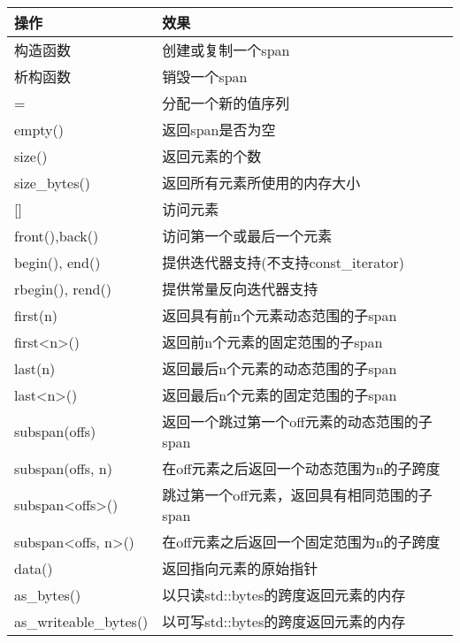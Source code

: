 \begin{longtable}[c]{|l|l|}
\hline
\textbf{操作} & \textbf{效果}                                                      \\ \hline
\endfirsthead
%
\endhead
%
构造函数       & 创建或复制一个span                                             \\ \hline
析构函数         & 销毁一个span                                                      \\ \hline
=                  & 分配一个新的值序列                                    \\ \hline
empty()            & 返回span是否为空                                    \\ \hline
size()             & 返回元素的个数                                       \\ \hline
size\_bytes()      & 返回所有元素所使用的内存大小                     \\ \hline
{[}{]}             & 访问元素                                                  \\ \hline
front(),back()     & 访问第一个或最后一个元素                                   \\ \hline
begin(), end()     & 提供迭代器支持(不支持const\_iterator)               \\ \hline
rbegin(), rend()   & 提供常量反向迭代器支持                           \\ \hline
first(n)           & 返回具有前n个元素动态范围的子span       \\ \hline
first\textless{}n\textgreater{}()         & 返回前n个元素的固定范围的子span            \\ \hline
last(n)            & 返回最后n个元素的动态范围的子span        \\ \hline
last\textless{}n\textgreater{}()          & 返回最后n个元素的固定范围的子span             \\ \hline
subspan(offs)                             & 返回一个跳过第一个off元素的动态范围的子span \\ \hline
subspan(offs, n)   & 在off元素之后返回一个动态范围为n的子跨度      \\ \hline
subspan\textless{}offs\textgreater{}()    & 跳过第一个off元素，返回具有相同范围的子span    \\ \hline
subspan\textless{}offs, n\textgreater{}() & 在off元素之后返回一个固定范围为n的子跨度           \\ \hline
data()             & 返回指向元素的原始指针                                \\ \hline
as\_bytes()        & 以只读std::bytes的跨度返回元素的内存 \\ \hline
as\_writeable\_bytes()                    & 以可写std::bytes的跨度返回元素的内存     \\ \hline
\end{longtable}

